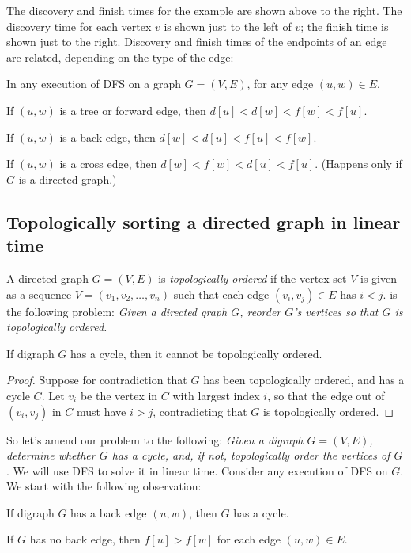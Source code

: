 \documentclass[11pt]{article}
\begin{document}
\smallskip

The discovery and finish times for the example are shown above to the right.
The discovery time for each vertex $v$
is shown just to the left of $v$;
the finish time is shown just to the right.
Discovery and finish times of the endpoints
of an edge are related, depending on the type of the edge:
\begin{observation}\label{graphs: df}
  In any execution of DFS on a graph $G=(V,E)$,
  for any edge $(u,w)\in E$,
  \begin{mylist}
  \item If $(u,w)$ is a tree or forward edge, then $d[u] < d[w] < f[w] < f[u]$. 
  \item If $(u,w)$ is a back edge, then $d[w] < d[u] < f[u] < f[w]$. 
  \item If $(u,w)$ is a cross edge, then $d[w] < f[w] < d[u] < f[u]$.  (Happens only if $G$ is a directed graph.)
  \end{mylist}  
\end{observation}

\subsection{Topologically sorting a directed graph in linear time}\label{graphs: sec: topological sort}
A directed graph $G=(V,E)$
is \emph{topologically ordered}
if the vertex set $V$ is given as a sequence $V=(v_1,v_2,\ldots,v_n)$
such that each edge $(v_i,v_j)\in E$ has $i < j$.
 is the following problem:
\emph{Given a directed graph $G$, reorder $G$'s vertices so that $G$ is topologically ordered.}

\begin{lemma}
  If digraph $G$ has a cycle, then it cannot be topologically ordered.
\end{lemma}
\begin{proof}
  Suppose for contradiction that $G$ has been topologically ordered,
  and has a cycle $C$.
  Let $v_i$ be the vertex in $C$ with largest index $i$,
  so that the edge out of $(v_i, v_j)$ in $C$ must have $i > j$,
  contradicting that $G$ is topologically ordered.
\end{proof}

So let's amend our problem to the following:
\emph{Given a digraph $G=(V,E)$, determine whether $G$ has a cycle,
  and, if not, topologically order the vertices of $G$}.
We will use DFS to solve it in linear time.
Consider any execution of DFS on $G$.
We start with the following observation:
\begin{observation}\label{graphs: back}
  \begin{mylist}
  \item[(i)] If digraph $G$ has a back edge $(u,w)$, then $G$ has a cycle. 
  \item[(ii)] If $G$ has no back edge, then $f[u] > f[w]$ for each edge $(u,w)\in E$.
  \end{mylist}
\end{observation}
\end{document}
